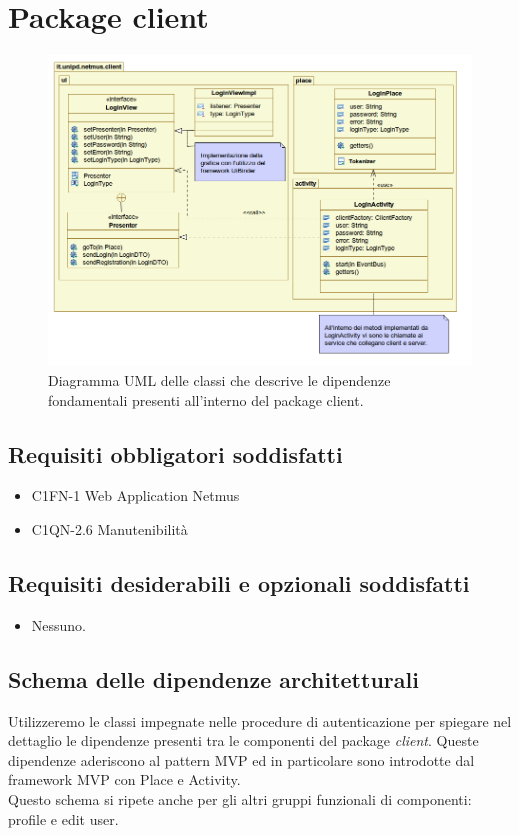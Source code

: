 \newpage
\section{Package client}

\begin{figure}[!h]
  \centering
  \includegraphics[width=14cm]{img/DP/package.png}
\caption{Diagramma UML delle classi che descrive le dipendenze
fondamentali presenti all'interno del package client.}
\end{figure}

\subsection*{Requisiti obbligatori soddisfatti}
\begin{itemize}
	\item C1FN-1 Web Application Netmus
	\item C1QN-2.6 Manutenibilit\`a
\end{itemize}
\subsection*{Requisiti desiderabili e opzionali soddisfatti}
\begin{itemize}
    \item Nessuno.
\end{itemize}
\subsection*{Schema delle dipendenze architetturali}
Utilizzeremo le classi impegnate nelle procedure di autenticazione per spiegare
nel dettaglio le dipendenze presenti tra le componenti del package
\emph{client}. 
Queste dipendenze aderiscono al pattern MVP ed in particolare sono introdotte
dal framework MVP con Place e Activity.\\
Questo schema si ripete anche per gli altri gruppi funzionali di componenti:
profile e edit user.


